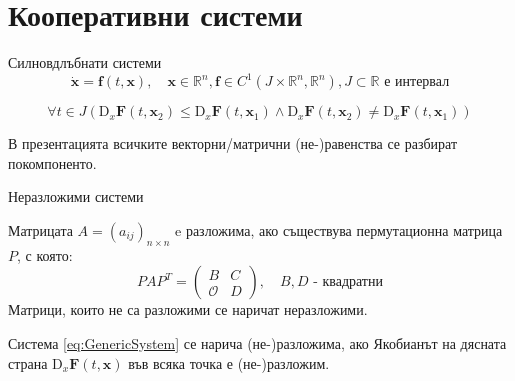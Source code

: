\section{Кооперативни системи}
\begin{frame}[t]{Силновдлъбнати системи}
  \begin{equation}
    \label{eq:GenericSystem}
    \dot{\boldsymbol{x}} = \boldsymbol{f}(t, \boldsymbol{x}),  \quad \boldsymbol{x} \in \mathbb{R}^n, \boldsymbol{f} \in C^1(J \times \mathbb{R}^n, \mathbb{R}^n), J \subset \mathbb{R} \text{ е интервал}
    \end{equation}

\begin{definition}

  \begin{equation}
     \forall{t \in J} \left(\mathrm{D}_x\boldsymbol{F}(t, \boldsymbol{x}_2) \leq \mathrm{D}_x\boldsymbol{F}(t, \boldsymbol{x}_1) \wedge \mathrm{D}_x\boldsymbol{F}(t, \boldsymbol{x}_2) \neq \mathrm{D}_x\boldsymbol{F}(t, \boldsymbol{x}_1)\right)
    \end{equation}
  \end{definition}

  \begin{nota-bene}
    В презентацията всичките векторни/матрични (не-)равенства се разбират покомпоненто.
  \end{nota-bene}
\end{frame}

\begin{frame}[t]{Неразложими системи}
  \begin{definition}
    Матрицата $A=(a_{ij})_{n \times n}$ e разложима, ако съществува пермутационна матрица $P$, с която:
    \begin{equation*}
      PAP^T =
      \begin{pmatrix}
        B & C \\
        \mathscr{O} & D
      \end{pmatrix}, \quad B, D \text{ - квадратни}
    \end{equation*}
    Матрици, които не са разложими се наричат неразложими.
  \end{definition}
  \begin{definition}
    Система \eqref{eq:GenericSystem} се нарича (не-)разложима, ако Якобианът на дясната страна $\mathrm{D}_x\boldsymbol{F}(t, \boldsymbol{x})$ във всяка точка е (не-)разложим.
  \end{definition}

\end{frame}

